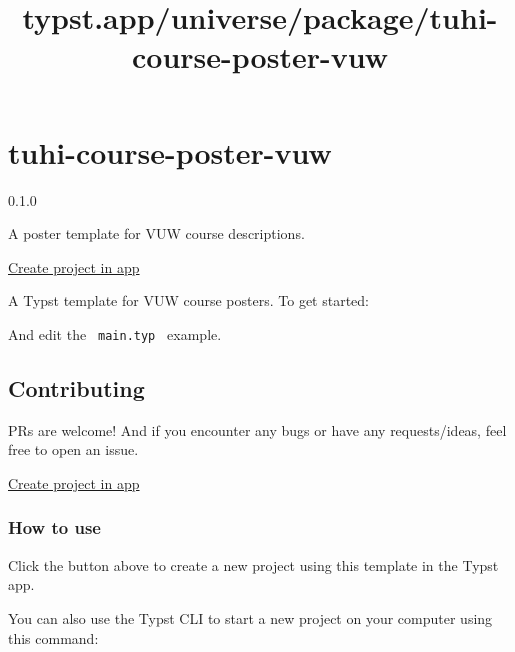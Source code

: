 \title{typst.app/universe/package/tuhi-course-poster-vuw}

\label{banner}
\label{template-thumbnail}

\section{tuhi-course-poster-vuw}\label{tuhi-course-poster-vuw}

{ 0.1.0 }

A poster template for VUW course descriptions.

\href{/app?template=tuhi-course-poster-vuw&version=0.1.0}{Create project
in app}

\label{readme}
A Typst template for VUW course posters. To get started:

\begin{Shaded}
\begin{Highlighting}[]
\end{Highlighting}
\end{Shaded}

And edit the \texttt{\ main.typ\ } example.


\subsection{Contributing}\label{contributing}

PRs are welcome! And if you encounter any bugs or have any
requests/ideas, feel free to open an issue.

\href{/app?template=tuhi-course-poster-vuw&version=0.1.0}{Create project
in app}

\subsubsection{How to use}\label{how-to-use}

Click the button above to create a new project using this template in
the Typst app.

You can also use the Typst CLI to start a new project on your computer
using this command:


